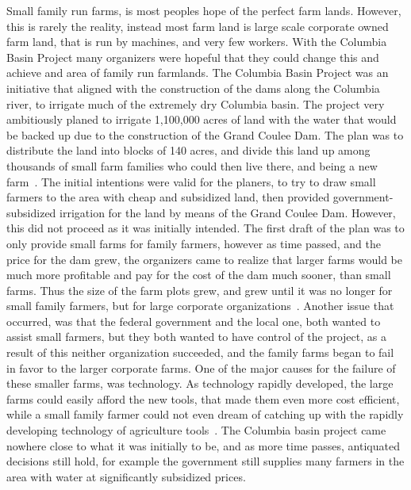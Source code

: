 \documentclass[12pt,twoside]{article}
\begin{document}
Small family run farms, is most peoples hope of the perfect farm lands. However, this is rarely the reality, instead most farm land is large scale corporate owned farm land, that is run by machines, and very few workers. With the Columbia Basin Project many organizers were hopeful that they could change this and achieve and area of family run farmlands. The Columbia Basin Project was an initiative that aligned with the construction of the dams along the Columbia river, to irrigate much of the extremely dry Columbia basin. The project very ambitiously planed to irrigate 1,100,000 acres of land with the water that would be backed up due to the construction of the Grand Coulee Dam. The plan was to distribute the land into blocks of 140 acres, and divide this land up among thousands of small farm families who could then live there, and being a new farm~\cite{GCD_CBP}. The initial intentions were valid for the planers, to try to draw small farmers to the area with cheap and subsidized land, then provided government-subsidized irrigation for the land by means of the Grand Coulee Dam. However, this did not proceed as it was initially intended. The first draft of the plan was to only provide small farms for family farmers, however as time passed, and the price for the dam grew, the organizers came to realize that larger farms would be much more profitable and pay for the cost of the dam much sooner, than small farms. Thus the size of the farm plots grew, and grew until it was no longer for small family farmers, but for large corporate organizations~\cite{CBP}. Another issue that occurred, was that the federal government and the local one, both wanted to assist small farmers, but they both wanted to have control of the project, as a result of this neither organization succeeded, and the family farms began to fail in favor to the larger corporate farms. One of the major causes for the failure of these smaller farms, was technology. As technology rapidly developed, the large farms could easily afford the new tools, that made them even more cost efficient, while a small family farmer could not even dream of catching up with the rapidly developing technology of agriculture tools~\cite{CBP}. The Columbia basin project came nowhere close to what it was initially to be, and as more time passes, antiquated decisions still hold, for example the government still supplies many farmers in the area with water at significantly subsidized prices.
\par
\end{document}
